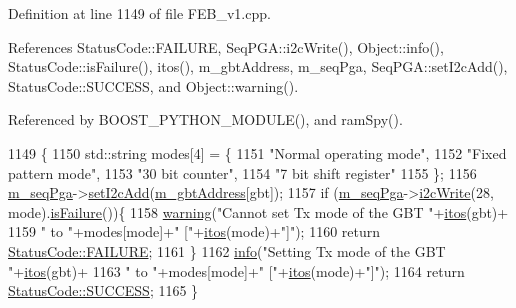 Definition at line 1149 of file F\+E\+B\+\_\+v1.\+cpp.



References Status\+Code\+::\+F\+A\+I\+L\+U\+RE, Seq\+P\+G\+A\+::i2c\+Write(), Object\+::info(), Status\+Code\+::is\+Failure(), itos(), m\+\_\+gbt\+Address, m\+\_\+seq\+Pga, Seq\+P\+G\+A\+::set\+I2c\+Add(), Status\+Code\+::\+S\+U\+C\+C\+E\+SS, and Object\+::warning().



Referenced by B\+O\+O\+S\+T\+\_\+\+P\+Y\+T\+H\+O\+N\+\_\+\+M\+O\+D\+U\+L\+E(), and ram\+Spy().


\begin{DoxyCode}
1149                                                \{
1150   std::string modes[4] = \{
1151     \textcolor{stringliteral}{"Normal operating mode"},
1152     \textcolor{stringliteral}{"Fixed pattern mode"},
1153     \textcolor{stringliteral}{"30 bit counter"},
1154     \textcolor{stringliteral}{"7 bit shift register"}
1155   \};
1156   \hyperlink{classFEB__v1_a6c7804ac86796f233a8393043adf2e77}{m\_seqPga}->\hyperlink{classSeqPGA_a4ef334e4d2cb417b49033dce951728cd}{setI2cAdd}(\hyperlink{classFEB__v1_ac625855df976f16694178f1a4c0eef1e}{m\_gbtAddress}[gbt]);
1157   \textcolor{keywordflow}{if} (\hyperlink{classFEB__v1_a6c7804ac86796f233a8393043adf2e77}{m\_seqPga}->\hyperlink{classSeqPGA_a429076ca3a4ece94182bd95c623bb9d0}{i2cWrite}(28, mode).\hyperlink{classStatusCode_a5dd22dc6eb2c52fc4cabc58f6dea2eb7}{isFailure}())\{
1158     \hyperlink{classObject_a65cd4fda577711660821fd2cd5a3b4c9}{warning}(\textcolor{stringliteral}{"Cannot set Tx mode of the GBT "}+\hyperlink{Tools_8h_af330027dbdafb9a30768b3613c553e60}{itos}(gbt)+
1159      \textcolor{stringliteral}{" to "}+modes[mode]+\textcolor{stringliteral}{" ["}+\hyperlink{Tools_8h_af330027dbdafb9a30768b3613c553e60}{itos}(mode)+\textcolor{stringliteral}{"]"});
1160     \textcolor{keywordflow}{return} \hyperlink{classStatusCode_a6f565cbeadc76d14c72f047e5e85eb4ba3da73d4c469762eb9d3c960368252b26}{StatusCode::FAILURE};
1161   \}
1162   \hyperlink{classObject_a644fd329ea4cb85f54fa6846484b84a8}{info}(\textcolor{stringliteral}{"Setting Tx mode of the GBT "}+\hyperlink{Tools_8h_af330027dbdafb9a30768b3613c553e60}{itos}(gbt)+
1163        \textcolor{stringliteral}{" to "}+modes[mode]+\textcolor{stringliteral}{" ["}+\hyperlink{Tools_8h_af330027dbdafb9a30768b3613c553e60}{itos}(mode)+\textcolor{stringliteral}{"]"});
1164   \textcolor{keywordflow}{return} \hyperlink{classStatusCode_a6f565cbeadc76d14c72f047e5e85eb4badd0da38d3ba0d922efd1f4619bc37ad8}{StatusCode::SUCCESS};  
1165 \}
\end{DoxyCode}
\mbox{\label{classFEB__v1_ab7c261039c872c9f039fb7366a84d271}} 
